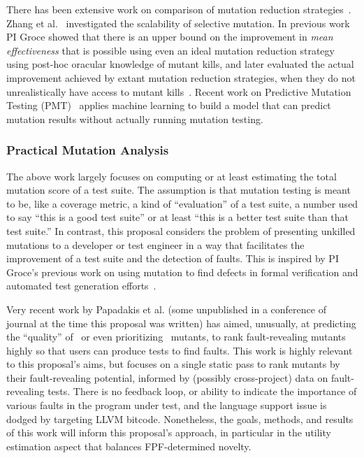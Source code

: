There has been extensive work on comparison of mutation
reduction strategies~\cite{zhang2010isoperator,zhang2013operator}.
Zhang et al.~\cite{zhang2014an} investigated the scalability of
selective mutation.
In previous work~\cite{gopinath2016on} PI Groce showed that there is
an upper bound on the improvement
in \emph{mean effectiveness} that is possible using even
an ideal mutation reduction strategy using post-hoc oracular knowledge of mutant
kills, and later evaluated the actual improvement
achieved by extant mutation reduction strategies, when they do not
unrealistically have access to
mutant kills~\cite{gopinath2017mutation}.  Recent work on Predictive
Mutation Testing (PMT)~\cite{zhang2016predictive} applies machine
learning to build a model that can predict mutation results without
actually running mutation testing.

\subsubsection{Practical Mutation Analysis}

The above work largely focuses on computing or at least estimating the
total mutation score of a
test suite.  The assumption is that mutation testing is
meant to be, like a coverage metric, a kind of ``evaluation'' of a
test suite, a number used to say ``this is a good test suite'' or at
least ``this is a better test suite than that test suite.''  In contrast,
this proposal considers the problem of presenting unkilled mutations to
a developer or test engineer in a way that facilitates the improvement
of a test suite and the detection of faults.  This is inspired by PI Groce's
previous work on using mutation to find defects in formal verification
and automated test generation
efforts~\cite{groce2015verified,groce2018verified,mutKernel}.

Very recent work by Papadakis et al. (some unpublished in a conference
of journal at the time this proposal was written) has
aimed, unusually, at predicting the ``quality'' of~\cite{MutQuality}
or even prioritizing~\cite{FaRM} mutants, to rank fault-revealing
mutants highly so that users can produce tests to find faults.  This
work is highly relevant to this proposal's aims, but focuses on a single static
pass to rank mutants by their fault-revealing potential, informed by
(possibly cross-project)
data on fault-revealing tests.  There is no feedback loop, or ability
to indicate the importance of various faults in the program under
test, and the language support issue is dodged by targeting LLVM
bitcode.  Nonetheless, the goals, methods, and results of this work
will inform this proposal's approach, in particular in the utility estimation
aspect that balances FPF-determined novelty.

